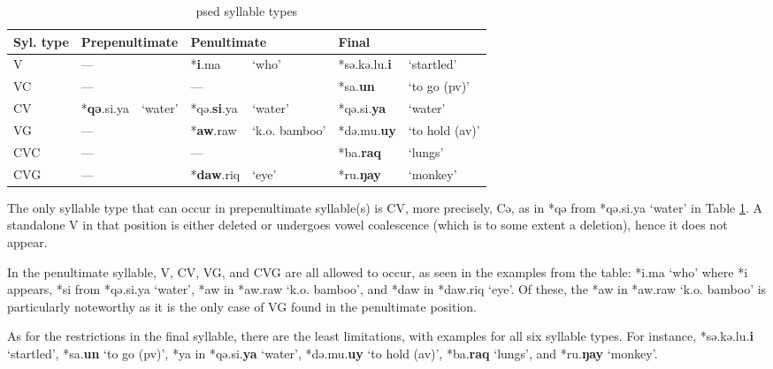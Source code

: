 \begin{table}[!htbp]
\centering
\caption{\acl{psed} syllable types}
\label{tab:psed_syl_type}
\begin{tabular}{lllllll}
\hline
Syl. type     & \multicolumn{2}{l}{Prepenultimate} & \multicolumn{2}{l}{Penultimate} & \multicolumn{2}{l}{Final}        \\ \hline
V             & ---               &                & *\textbf{i}.ma        & `who'            & *sə.kə.lu.\textbf{i} & `startled'         \\
VC            & ---               &                & ---          &                  & *sa.\textbf{un}      & `to go (\acs{pv})'   \\
CV            & *\textbf{qə}.si.ya         & `water'        & *qə.\textbf{si}.ya    & `water'          & *qə.si.\textbf{ya}   & `water'            \\
VG            & ---               &                & *\textbf{aw}.raw      & `k.o. bamboo'    & *də.mu.\textbf{uy}   & `to hold (\acs{av})' \\
CVC           & ---               &                & ---          &                  & *ba.\textbf{raq}     & `lungs'            \\
CVG           & ---               &                & *\textbf{daw}.riq     & `eye'            & *ru.\textbf{ŋay}     & `monkey'           \\ \hline
\end{tabular}
\end{table}

The only syllable type that can occur in prepenultimate syllable(s) is CV, more precisely, Cə, as in *qə from *qə.si.ya `water' in Table \ref{tab:psed_syl_type}. A standalone V in that position is either deleted or undergoes vowel coalescence (which is to some extent a deletion), hence it does not appear. 

In the penultimate syllable, V, CV, VG, and CVG are all allowed to occur, as seen in the examples from the table: *i.ma `who' where *i appears, *si from *qə.si.ya `water', *aw in *aw.raw `k.o. bamboo', and *daw in *daw.riq `eye'. Of these, the *aw in *aw.raw `k.o. bamboo' is particularly noteworthy as it is the only case of VG found in the penultimate position.

As for the restrictions in the final syllable, there are the least limitations, with examples for all six syllable types. For instance, *sə.kə.lu.\textbf{i} `startled', *sa.\textbf{un} `to go (\acs{pv})', *ya in *qə.si.\textbf{ya} `water', *də.mu.\textbf{uy} `to hold (\acs{av})', *ba.\textbf{raq} `lungs', and *ru.\textbf{ŋay} `monkey'. 

